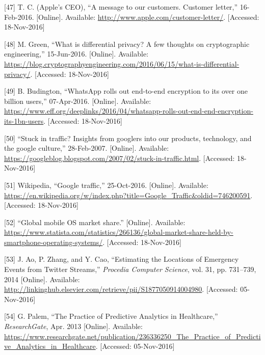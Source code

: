 \documentclass[12pt,english,a4paper,titlepage,cleardoublepage=empty,dottedtoc]{report}
\begin{document}
\hypertarget{ref-web_2016_apple_customer-letter}{}
{[}47{]} T. C. (Apple's CEO), ``A message to our customers. Customer
letter,'' 16-Feb-2016. {[}Online{]}. Available:
\url{http://www.apple.com/customer-letter/}. {[}Accessed: 18-Nov-2016{]}

\hypertarget{ref-web_2016_what-is-differential-privacy}{}
{[}48{]} M. Green, ``What is differential privacy? A few thoughts on
cryptographic engineering,'' 15-Jun-2016. {[}Online{]}. Available:
\url{https://blog.cryptographyengineering.com/2016/06/15/what-is-differential-privacy/}.
{[}Accessed: 18-Nov-2016{]}

\hypertarget{ref-web_2016_eff_whatsapp-rolls-out-emd-to-end-encryption}{}
{[}49{]} B. Budington, ``WhatsApp rolls out end-to-end encryption to its
over one billion users,'' 07-Apr-2016. {[}Online{]}. Available:
\url{https://www.eff.org/deeplinks/2016/04/whatsapp-rolls-out-end-end-encryption-its-1bn-users}.
{[}Accessed: 18-Nov-2016{]}

\hypertarget{ref-web_2007_introducing-google-traffic}{}
{[}50{]} ``Stuck in traffic? Insights from googlers into our products,
technology, and the google culture,'' 28-Feb-2007. {[}Online{]}.
Available:
\url{https://googleblog.blogspot.com/2007/02/stuck-in-traffic.html}.
{[}Accessed: 18-Nov-2016{]}

\hypertarget{ref-web_2016_wikipedia_google-traffic}{}
{[}51{]} Wikipedia, ``Google traffic,'' 25-Oct-2016. {[}Online{]}.
Available:
\url{https://en.wikipedia.org/w/index.php?title=Google_Traffic\&oldid=746200591}.
{[}Accessed: 18-Nov-2016{]}

\hypertarget{ref-graphic_2016_global-mobile-os-market-share}{}
{[}52{]} ``Global mobile OS market share.'' {[}Online{]}. Available:
\url{https://www.statista.com/statistics/266136/global-market-share-held-by-smartphone-operating-systems/}.
{[}Accessed: 18-Nov-2016{]}

\hypertarget{ref-estimating-the-locations-of-emergency-events-from-twitter-streams_2014}{}
{[}53{]} J. Ao, P. Zhang, and Y. Cao, ``Estimating the Locations of
Emergency Events from Twitter Streams,'' \emph{Procedia Computer
Science}, vol. 31, pp. 731--739, 2014 {[}Online{]}. Available:
\url{http://linkinghub.elsevier.com/retrieve/pii/S1877050914004980}.
{[}Accessed: 05-Nov-2016{]}

\hypertarget{ref-the-practice-of-predictive-analytics-in-healthcare_2013}{}
{[}54{]} G. Palem, ``The Practice of Predictive Analytics in
Healthcare,'' \emph{ResearchGate}, Apr. 2013 {[}Online{]}. Available:
\url{https://www.researchgate.net/publication/236336250_The_Practice_of_Predictive_Analytics_in_Healthcare}.
{[}Accessed: 05-Nov-2016{]}
\end{document}

